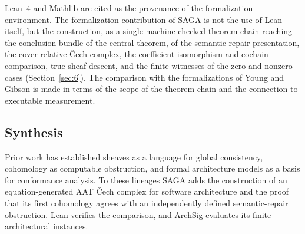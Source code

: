 Lean~4 \citep{demoura2021lean} and Mathlib \citep{mathlib2020lean} are
cited as the provenance of the formalization environment. The
formalization contribution of SAGA is not the use of Lean itself, but
the construction, as a single machine-checked theorem chain reaching
the conclusion bundle of the central theorem, of the semantic repair
presentation, the cover-relative \v{C}ech complex, the coefficient
isomorphism and cochain comparison, true sheaf descent, and the finite
witnesses of the zero and nonzero cases (Section~\ref{sec:6}). The
comparison with the formalizations of Young and Gibson is made in
terms of the scope of the theorem chain and the connection to
executable measurement.

\subsection{Synthesis}\label{sec:85}

Prior work has established sheaves as a language for global
consistency, cohomology as computable obstruction, and formal
architecture models as a basis for conformance analysis. To these
lineages SAGA adds the construction of an equation-generated AAT
\v{C}ech complex for software architecture and the proof that its
first cohomology agrees with an independently defined semantic-repair
obstruction. Lean verifies the comparison, and ArchSig evaluates its
finite architectural instances.
